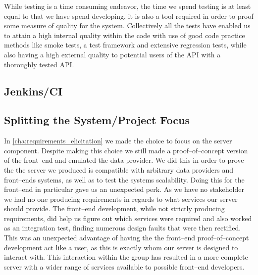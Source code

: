 While testing is a time consuming endeavor, the time we spend testing is at least equal to that we have spend developing, it is also a tool required in order to proof some measure of quality for the system.
Collectively all the tests have enabled us to attain a high internal quality within the code with use of good code practice methods like smoke tests, a test framework and extensive regression tests, while also having a high external quality to potential users of the API with a thoroughly tested API.



\subsection{Jenkins/CI}
\subsection{Splitting the System/Project Focus}
In \cref{cha:requirements_elicitation} we made the choice to focus on the server component.
Despite making this choice we still made a proof--of--concept version of the front--end and emulated the data provider.
We did this in order to prove the the server we produced is compatible with arbitrary data providers and front--ends systems, as well as to test the systems scalability.
Doing this for the front--end in particular gave us an unexpected perk.
As we have no stakeholder we had no one producing requirements in regards to what services our server should provide.
The front--end development, while not strictly producing requirements, did help us figure out which services were required and also worked as an integration test, finding numerous design faults that were then rectified.
This was an unexpected advantage of having the the front--end proof--of--concept development act like a user, as this is exactly whom our server is designed to interact with.
This interaction within the group has resulted in a more complete server with a wider range of services available to possible front--end developers.

